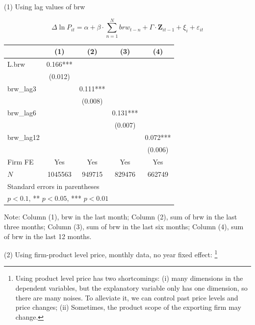 \documentclass[12pt]{article}
\begin{document}
(1) Using lag values of brw

\begin{equation}
    \Delta \ln P_{it} = \alpha + \beta \cdot \sum^{N}_{n=1}  brw_{t-n}+ \Gamma \cdot \textbf{Z}_{it-1}+\xi_{i}+\varepsilon_{i t}
\end{equation}

\begin{center}
\begin{tabular}{l*{4}{c}}
\toprule
            &\multicolumn{1}{c}{(1)}   &\multicolumn{1}{c}{(2)}   &\multicolumn{1}{c}{(3)}   &\multicolumn{1}{c}{(4)}   \\
\midrule
L.brw       &       0.166***&               &               &               \\
            &     (0.012)   &               &               &               \\
\addlinespace
brw\_lag3    &               &       0.111***&               &               \\
            &               &     (0.008)   &               &               \\
\addlinespace
brw\_lag6    &               &               &       0.131***&               \\
            &               &               &     (0.007)   &               \\
\addlinespace
brw\_lag12   &               &               &               &       0.072***\\
            &               &               &               &     (0.006)   \\
\addlinespace
Firm FE     &         Yes   &         Yes   &         Yes   &         Yes   \\
\midrule
\(N\)       &     1045563   &      949715   &      829476   &      662749   \\
\bottomrule
\multicolumn{5}{l}{\footnotesize Standard errors in parentheses}\\
\multicolumn{5}{l}{\footnotesize * \(p<0.1\), ** \(p<0.05\), *** \(p<0.01\)}\\
\end{tabular}
\end{center}

Note: Column (1), brw in the last month; Column (2), sum of brw in the last three months; Column (3), sum of brw in the last six months; Column (4), sum of brw in the last 12 months.

(2) Using firm-product level price, monthly data, no year fixed effect: \footnote{Using product level price has two shortcomings: (i) many dimensions in the dependent variables, but the explanatory variable only has one dimension, so there are many noises. To alleviate it, we can control past price levels and price changes; (ii) Sometimes, the product scope of the exporting firm may change.}
\end{document}
